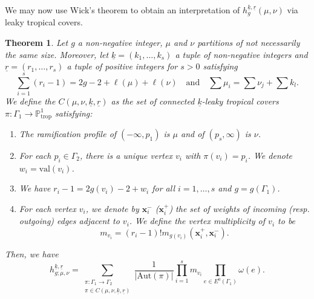 \documentclass[10pt,a4paper,oneside,no-math,reqno]{amsart}%
\theoremstyle{plain}
\newtheorem{theorem}{Theorem}[section]
\theoremstyle{definition}
\theoremstyle{remark}
\numberwithin{equation}{section}
\newcommand{\mb}[1]{\mathbb{#1}}
\newcommand{\1}{\mathds{1}}
\renewcommand{\P}{\mb{P}}
\newcommand{\<}{\langle}
\renewcommand{\>}{\rangle}
\begin{document}
  

    We may now use Wick's theorem to obtain an interpretation of $h_g^{\underline{k},\underline{r}}(\mu,\nu)$ via leaky tropical covers.


\begin{theorem}
\label{thm-corr}
    Let $g$ a non-negative integer, $\mu$ and $\nu$ partitions of not necessarily the same size. Moreover, let $\underline{k}=(k_1,\dots,k_s)$ a tuple of non-negative integers and $\underline{r}=(r_1,\dots,r_s)$ a tuple of positive integers for $s>0$ satisfying
    \begin{equation}
        \sum_{i=1}^s (r_i - 1) 
        =
        2g-2 + \ell(\mu) + \ell(\nu)
        \quad
        \text{and}
        \quad\sum \mu_i
        =
        \sum\nu_j+\sum k_l.
    \end{equation}
    We define the $C(\mu,\nu,\underline{k},\underline{r})$ as the set of connected $\underline{k}$-leaky tropical covers $\pi\colon\Gamma_1\to \P^1_{\text{trop}}$ satisfying:
    \begin{enumerate}
        \item The ramification profile of $(-\infty,p_1)$ is $\mu$ and of $(p_s,\infty)$ is $\nu$.
        \item For each $p_i\in \Gamma_2$, there is a unique vertex $v_i$ with $\pi(v_i)=p_i$. We denote $w_i=\mathrm{val}(v_i)$.
        \item We have $r_i-1 = 2g(v_i)-2+w_i$ for all $i=1,\dots,s$ and $g=g(\Gamma_1)$.
        \item For each vertex $v_i$, we denote by $\textbf{x}^-_{i}$ ($\textbf{x}^+_{i}$) the set of weights of incoming (resp. outgoing) edges adjacent to $v_i$. We define the vertex multiplicity of $v_i$ to be
        \begin{equation}
            m_{v_i}
            =
            (r_i-1)! m_{g(v_i)}(\textbf{x}^+_i,\textbf{x}^-_i).
        \end{equation}
    \end{enumerate}
    Then, we have
    \begin{equation}
        h^{\underline{k},\underline{r}}_{g;\mu,\nu}
        =
        \sum_{\substack{\pi\colon\Gamma_1\to\Gamma_2\\\pi\in C(\mu,\nu,\underline{k},\underline{r})}} \frac{1}{|\mathrm{Aut}(\pi)|} \prod_{i=1}^s m_{v_i} \prod_{e\in E^0(\Gamma_1)} \omega(e).
    \end{equation}
    \end{theorem}
\end{document}
